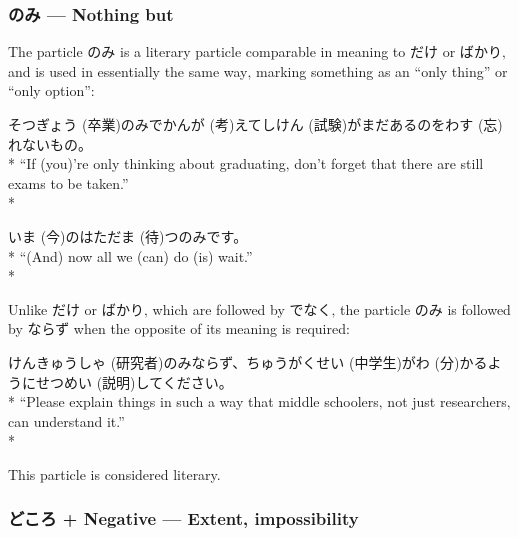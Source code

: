 \documentclass[11pt, b5paper, twoside, openright, onecolumn]{book}
\makeatletter
\newcommand*{\rubystack}[2]{{\relscale{0.5}%
  \begin{tabular}[b]{@{}c@{}}%
    {#1}\\%
   {\textscale{2}{#2}}%
  \end{tabular}}%
}
\DeclareRobustCommand*{\ruby}[2]{%
  \mbox{%
    \setlength{\parskip}{0ex}%
    \BeginAccSupp{method=pdfstringdef,ActualText={#1}}%
      \rubystack{\phantom{#2}}{#1}%
      \llap{%
        \rubystack{#2}{\phantom{#1}}%
      }%
    \EndAccSupp{}%
  }%
}
\renewcommand*{\ruby}[2]{#2 (#1)}%
\newenvironment{exampleblock}{
\setlength{\parindent}{0.6in}
\begin{minipage}[t]{\dimexpr\textwidth-\parindent}}
{\end{minipage}}
\makeatother
\begin{document}
\subsubsection{のみ — Nothing but}


The particle のみ is a literary particle comparable in meaning to だけ or ばかり‚ and is used in essentially the same way‚ marking something as an “only thing” or “only option”:

\vspace{0.4cm}
\begin{exampleblock}
\ruby{卒業}{そつぎょう}のみで\ruby{考}{かんが}えて\ruby{試験}{しけん}がまだあるのを\ruby{忘}{わす}れないもの。 \\* 
“If (you)’re only thinking about graduating‚ don’t forget that there are still exams to be taken.” \\* 
\end{exampleblock}
\vspace{0.2cm}

\begin{exampleblock}
\ruby{今}{いま}のはただ\ruby{待}{ま}つのみです。 \\* 
“(And) now all we (can) do (is) wait.” \\* 
\end{exampleblock}
\vspace{0.2cm}

Unlike だけ or ばかり‚ which are followed by でなく‚ the particle のみ is followed by ならず when the opposite of its meaning is required:

\vspace{0.4cm}
\begin{exampleblock}
\ruby{研究者}{けんきゅうしゃ}のみならず、\ruby{中学生}{ちゅうがくせい}が\ruby{分}{わ}かるように\ruby{説明}{せつめい}してください。 \\* 
“Please explain things in such a way that middle schoolers‚ not just researchers‚ can understand it.” \\* 
\end{exampleblock}
\vspace{0.2cm}

This particle is considered literary.

\subsubsection{どころ + Negative — Extent‚ impossibility}
\end{document}
